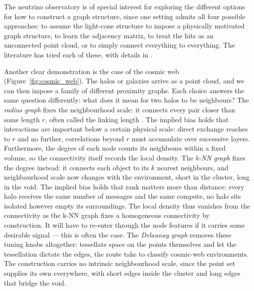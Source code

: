 \documentclass[graybox, envcountchap]{Template/svmult}
\begin{document}
The neutrino observatory is of special interest for exploring the different options for how to construct a graph structure, since one setting admits all four possible approaches: to assume the light-cone structure to impose a physically motivated graph structure, to learn the adjacency matrix, to treat the hits as an unconnected point cloud, or to simply connect everything to everything. The literature has tried each of these, with details in \citet{Jespersen2021_icecube_bachelor, Bukhari2023_icecube_kaggle, Sogaard2023_graphnet_neutrino, Orsoe2025_graphnet2_library, Orsoe2026_nubench_benchmark}. 

Another clear demonstration is the case of the cosmic web (Figure~\ref{fig:cosmic_web}). The halos or galaxies arrive as a point cloud, and we can then impose a family of different proximity graphs. Each choice answers the same question differently: what does it mean for two halos to be neighbours? The \emph{radius graph} fixes the neighbourhood scale: it connects every pair closer than some length $r$, often called the linking length \citep{Makinen2022_cosmicgraph_LSS, VillanuevaDomingo2022_cosmicgraph_clustering, Wu2023_galaxyenvironment_GNN, Wu2024_galaxyhalo_environment}. The implied bias holds that interactions are important below a certain physical scale: direct exchange reaches to $r$ and no further, correlations beyond $r$ must accumulate over successive layers. Furthermore, the degree of each node counts its neighbours within a fixed volume, so the connectivity itself records the local density. The \emph{k-NN graph} fixes the degree instead: it connects each object to its $k$ nearest neighbours, and neighbourhood scale now changes with the environment, short in the cluster, long in the void. The implied bias holds that rank matters more than distance: every halo receives the same number of messages and the same compute, no halo sits isolated however empty its surroundings. The local density thus vanishes from the connectivity as the k-NN graph fixes a homogeneous connectivity by construction. It will have to re-enter through the node features if it carries some desirable signal --- this is often the case. The \emph{Delaunay graph} removes these tuning knobs altogether: tessellate space on the points themselves and let the tessellation dictate the edges, the route \citet{Kololgi2025_cosmicweb_classification} take to classify cosmic-web environments. The construction carries no intrinsic neighbourhood scale, since the point set supplies its own everywhere, with short edges inside the cluster and long edges that bridge the void.
\end{document}
